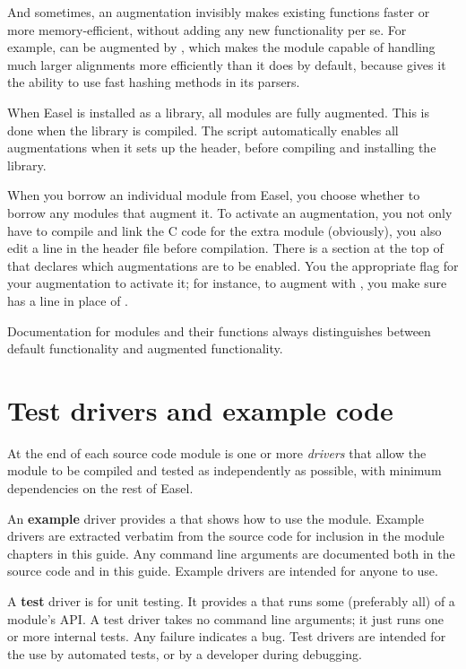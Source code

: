 And sometimes, an augmentation invisibly makes existing functions
faster or more memory-efficient, without adding any new functionality
per se.  For example,  can be augmented by
, which makes the  module capable of
handling much larger alignments more efficiently than it does by
default, because  gives it the ability to use fast
hashing methods in its parsers.

When Easel is installed as a library, all modules are fully
augmented. This is done when the library is compiled. The
 script automatically enables all augmentations when
it sets up the  header, before compiling and installing
the library.

When you borrow an individual module from Easel, you choose whether to
borrow any modules that augment it. To activate an augmentation, you
not only have to compile and link the C code for the extra module
(obviously), you also edit a line in the  header file
before compilation. There is a section at the top of 
that declares which augmentations are to be enabled. You
 the appropriate flag for your augmentation to
activate it; for instance, to augment with , you make sure
 has a line  in place
of .

Documentation for modules and their functions always distinguishes
between default functionality and augmented functionality.


\section{Test drivers and example code}

At the end of each source code module is one or more \emph{drivers}
that allow the module to be compiled and tested as independently as
possible, with minimum dependencies on the rest of Easel.

An \textbf{example} driver provides a  that shows how to
use the module. Example drivers are extracted verbatim from the source
code for inclusion in the module chapters in this guide. Any command
line arguments are documented both in the source code and in this
guide. Example drivers are intended for anyone to use.

A \textbf{test} driver is for unit testing. It provides a
 that runs some (preferably all) of a module's API. A
test driver takes no command line arguments; it just runs one or more
internal tests. Any failure indicates a bug. Test drivers are intended
for the use by automated tests, or by a developer during debugging.

